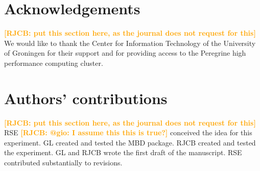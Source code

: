 \documentclass{article}
\newcommand*\richel[1]{\textcolor{orange}{\textbf{[RJCB: #1]}}}
\begin{document}
\section{Acknowledgements}

\richel{put this section here, as the journal does not request for this}
We would like to thank the Center for Information Technology of the University of Groningen for their support
and for providing access to the Peregrine high performance computing cluster.

\section{Authors' contributions}

\richel{put this section here, as the journal does not request for this}
RSE \richel{@gio: I assume this this is true?} conceived the idea for this experiment.
GL created and tested the MBD package.
RJCB created and tested the experiment.
GL and RJCB wrote the first draft of the manuscript. 
RSE contributed substantially to revisions.
\end{document}
